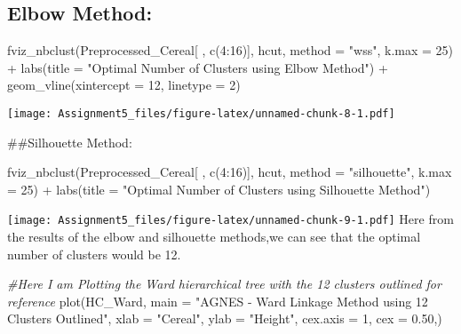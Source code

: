 \documentclass[
]{article}
\newenvironment{Shaded}{\begin{snugshade}}{\end{snugshade}}
\newcommand{\AttributeTok}[1]{\textcolor[rgb]{0.77,0.63,0.00}{#1}}
\newcommand{\CommentTok}[1]{\textcolor[rgb]{0.56,0.35,0.01}{\textit{#1}}}
\newcommand{\DecValTok}[1]{\textcolor[rgb]{0.00,0.00,0.81}{#1}}
\newcommand{\FloatTok}[1]{\textcolor[rgb]{0.00,0.00,0.81}{#1}}
\newcommand{\FunctionTok}[1]{\textcolor[rgb]{0.00,0.00,0.00}{#1}}
\newcommand{\NormalTok}[1]{#1}
\newcommand{\SpecialCharTok}[1]{\textcolor[rgb]{0.00,0.00,0.00}{#1}}
\newcommand{\StringTok}[1]{\textcolor[rgb]{0.31,0.60,0.02}{#1}}
\begin{document}
\hypertarget{elbow-method}{%
\subsection{Elbow Method:}\label{elbow-method}}

\begin{Shaded}
\begin{Highlighting}[]
\FunctionTok{fviz\_nbclust}\NormalTok{(Preprocessed\_Cereal[ , }\FunctionTok{c}\NormalTok{(}\DecValTok{4}\SpecialCharTok{:}\DecValTok{16}\NormalTok{)], hcut, }\AttributeTok{method =} \StringTok{"wss"}\NormalTok{, }\AttributeTok{k.max =} \DecValTok{25}\NormalTok{) }\SpecialCharTok{+}
  \FunctionTok{labs}\NormalTok{(}\AttributeTok{title =} \StringTok{"Optimal Number of Clusters using Elbow Method"}\NormalTok{) }\SpecialCharTok{+}
  \FunctionTok{geom\_vline}\NormalTok{(}\AttributeTok{xintercept =} \DecValTok{12}\NormalTok{, }\AttributeTok{linetype =} \DecValTok{2}\NormalTok{)}
\end{Highlighting}
\end{Shaded}

\texttt{[image: Assignment5\_files/figure-latex/unnamed-chunk-8-1.pdf]}

\#\#Silhouette Method:

\begin{Shaded}
\begin{Highlighting}[]
\FunctionTok{fviz\_nbclust}\NormalTok{(Preprocessed\_Cereal[ , }\FunctionTok{c}\NormalTok{(}\DecValTok{4}\SpecialCharTok{:}\DecValTok{16}\NormalTok{)], }
\NormalTok{                               hcut, }
                               \AttributeTok{method =} \StringTok{"silhouette"}\NormalTok{, }
                               \AttributeTok{k.max =} \DecValTok{25}\NormalTok{) }\SpecialCharTok{+}
  \FunctionTok{labs}\NormalTok{(}\AttributeTok{title =} \StringTok{"Optimal Number of Clusters using Silhouette Method"}\NormalTok{)}
\end{Highlighting}
\end{Shaded}

\texttt{[image: Assignment5\_files/figure-latex/unnamed-chunk-9-1.pdf]}
Here from the results of the elbow and silhouette methods,we can see
that the optimal number of clusters would be 12.

\begin{Shaded}
\begin{Highlighting}[]
\CommentTok{\#Here I am  Plotting the Ward hierarchical tree with the 12 clusters outlined for reference}
\FunctionTok{plot}\NormalTok{(HC\_Ward, }
     \AttributeTok{main =} \StringTok{"AGNES {-} Ward Linkage Method using 12 Clusters Outlined"}\NormalTok{,}
     \AttributeTok{xlab =} \StringTok{"Cereal"}\NormalTok{,}
     \AttributeTok{ylab =} \StringTok{"Height"}\NormalTok{,}
     \AttributeTok{cex.axis =} \DecValTok{1}\NormalTok{,}
     \AttributeTok{cex =} \FloatTok{0.50}\NormalTok{,)}
\end{Highlighting}
\end{Shaded}
\end{document}

